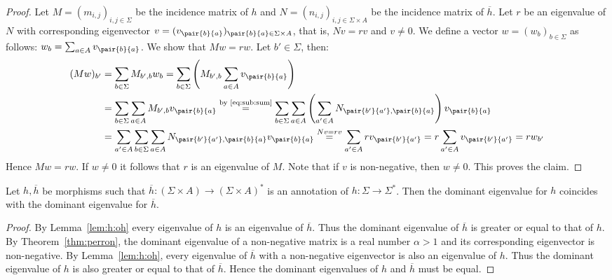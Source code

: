 \begin{proof}
  Let $M = (m_{i,j})_{i,j \in \Sigma}$ be the incidence matrix of $h$
  and $N = (n_{i,j})_{i,j \in \Sigma\times A}$ be the incidence matrix of $\overline{h}$.
  Let $r$ be an eigenvalue of $N$ with corresponding eigenvector $v = (v_{\pair{b}{a}})_{\pair{b}{a} \in \Sigma\times A}$,
  that is, $Nv = rv$ and $v\ne 0$.
  We define a vector $w = (w_b)_{b \in \Sigma}$ as follows:
  $w_b = \sum_{a \in A} v_{\pair{b}{a}}$.
  We show that $Mw = rw$.
  Let $b' \in \Sigma$, then:
  \begin{align*}
    (Mw)_{b'} 
    &= \sum_{b \in \Sigma} M_{b',b}w_b 
    = \sum_{b \in \Sigma} \left( M_{b',b} \sum_{a \in A} v_{\pair{b}{a}} \right)\\
    &= \sum_{b \in \Sigma} \sum_{a \in A} M_{b',b} v_{\pair{b}{a}} 
    \stackrel{\text{by \eqref{eq:sub:sum}}}{=} \sum_{b \in \Sigma} \sum_{a \in A} \left(\sum_{a' \in A} N_{\pair{b'}{a'},\pair{b}{a}}\right) v_{\pair{b}{a}} 
    \\
    &= \sum_{a' \in A} \sum_{b \in \Sigma} \sum_{a \in A} N_{\pair{b'}{a'},\pair{b}{a}} v_{\pair{b}{a}} 
    \stackrel{Nv = rv}{=} \sum_{a' \in A} r v_{\pair{b'}{a'}} 
    =  r \sum_{a' \in A} v_{\pair{b'}{a'}} 
    =  r w_{b'}
  \end{align*}  
  Hence $Mw = rw$.
  If $w \ne 0$ it follows that $r$ is an eigenvalue of $M$.
  Note that if $v$ is non-negative, then $w \ne 0$. This proves the claim.
\end{proof}

\begin{corollary}\label{corollary:dominant}
  Let $h,\overline{h}$ be morphisms such that $\overline{h} : (\Sigma \times A) \to (\Sigma \times A)^*$
  is an annotation of $h : \Sigma \to \Sigma^*$.
  Then the dominant eigenvalue for $h$ coincides with the dominant eigenvalue for $\overline{h}$.
\end{corollary}

\begin{proof}
  By Lemma~\ref{lem:h:oh} every eigenvalue of $h$ is an eigenvalue of $\overline{h}$.
  Thus the dominant eigenvalue of $\overline{h}$ is greater or equal to that of $h$.
  By Theorem~\ref{thm:perron}, the dominant eigenvalue of a non-negative matrix is a real number $\alpha > 1$
  and its corresponding eigenvector is non-negative.
  By Lemma~\ref{lem:h:oh}, every eigenvalue of $\overline{h}$ with a non-negative eigenvector is also an eigenvalue of $h$. 
  Thus the dominant eigenvalue of $h$ is also greater or equal to that of $\overline{h}$.
  Hence the dominant eigenvalues of $h$ and $\overline{h}$ must be equal.
\end{proof}




